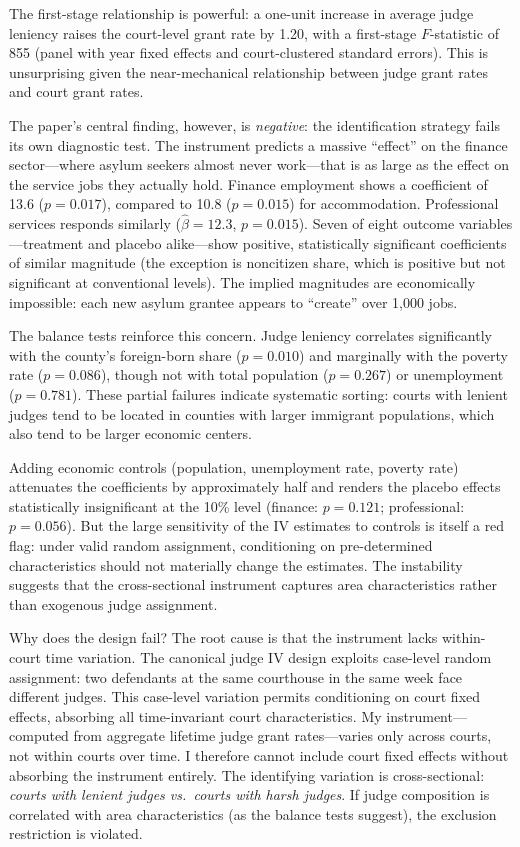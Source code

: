 \documentclass[12pt]{article}
\begin{document}
The first-stage relationship is powerful: a one-unit increase in average judge leniency raises the court-level grant rate by 1.20, with a first-stage $F$-statistic of 855 (panel with year fixed effects and court-clustered standard errors). This is unsurprising given the near-mechanical relationship between judge grant rates and court grant rates.

The paper's central finding, however, is \textit{negative}: the identification strategy fails its own diagnostic test. The instrument predicts a massive ``effect'' on the finance sector---where asylum seekers almost never work---that is as large as the effect on the service jobs they actually hold. Finance employment shows a coefficient of 13.6 ($p = 0.017$), compared to 10.8 ($p = 0.015$) for accommodation. Professional services responds similarly ($\hat{\beta} = 12.3$, $p = 0.015$). Seven of eight outcome variables---treatment and placebo alike---show positive, statistically significant coefficients of similar magnitude (the exception is noncitizen share, which is positive but not significant at conventional levels). The implied magnitudes are economically impossible: each new asylum grantee appears to ``create'' over 1,000 jobs.

The balance tests reinforce this concern. Judge leniency correlates significantly with the county's foreign-born share ($p = 0.010$) and marginally with the poverty rate ($p = 0.086$), though not with total population ($p = 0.267$) or unemployment ($p = 0.781$). These partial failures indicate systematic sorting: courts with lenient judges tend to be located in counties with larger immigrant populations, which also tend to be larger economic centers.

Adding economic controls (population, unemployment rate, poverty rate) attenuates the coefficients by approximately half and renders the placebo effects statistically insignificant at the 10\% level (finance: $p = 0.121$; professional: $p = 0.056$). But the large sensitivity of the IV estimates to controls is itself a red flag: under valid random assignment, conditioning on pre-determined characteristics should not materially change the estimates. The instability suggests that the cross-sectional instrument captures area characteristics rather than exogenous judge assignment.

Why does the design fail? The root cause is that the instrument lacks within-court time variation. The canonical judge IV design \citep{kling2006incarceration, dobbie2018effects, maestas2013does} exploits case-level random assignment: two defendants at the same courthouse in the same week face different judges. This case-level variation permits conditioning on court fixed effects, absorbing all time-invariant court characteristics. My instrument---computed from aggregate lifetime judge grant rates---varies only across courts, not within courts over time. I therefore cannot include court fixed effects without absorbing the instrument entirely. The identifying variation is cross-sectional: \textit{courts with lenient judges vs.\ courts with harsh judges}. If judge composition is correlated with area characteristics (as the balance tests suggest), the exclusion restriction is violated.
\end{document}
